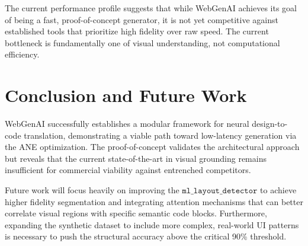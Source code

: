 \documentclass[11pt,a4paper]{article}
\begin{document}
The current performance profile suggests that while WebGenAI achieves its goal of being a fast, proof-of-concept generator, it is not yet competitive against established tools that prioritize high fidelity over raw speed. The current bottleneck is fundamentally one of visual understanding, not computational efficiency.

\section{Conclusion and Future Work}
WebGenAI successfully establishes a modular framework for neural design-to-code translation, demonstrating a viable path toward low-latency generation via the ANE optimization. The proof-of-concept validates the architectural approach but reveals that the current state-of-the-art in visual grounding remains insufficient for commercial viability against entrenched competitors.

Future work will focus heavily on improving the $\texttt{ml\_layout\_detector}$ to achieve higher fidelity segmentation and integrating attention mechanisms that can better correlate visual regions with specific semantic code blocks. Furthermore, expanding the synthetic dataset to include more complex, real-world UI patterns is necessary to push the structural accuracy above the critical 90\% threshold.



\end{document}
